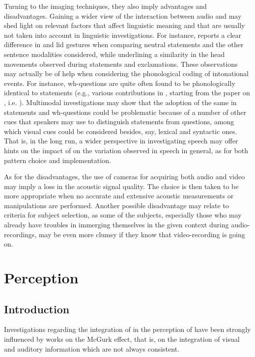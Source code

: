 \documentclass[output=paper]{langsci/langscibook}
\begin{document}
Turning to the imaging techniques, they also imply advantages and disadvantages. Gaining a wider view of the interaction between audio and  may shed light on relevant factors that affect linguistic meaning and that are usually not taken into account in linguistic investigations. For instance, \citet{GiliFivela2015informazionimultimodali} reports a clear difference in  and lid gestures when comparing neutral statements and the other sentence modalities considered, while underlining a similarity in the head movements observed during statements and exclamations. These observations may actually be of help when considering the phonological coding of intonational events. For instance, wh-questions are quite often found to be phonologically identical to statements (e.g., various contributions in \citealt{frotaPrieto2015}, starting from the paper on , i.e. \citealt{GiliFivelaETAL2015intonationalvariation}). Multimodal investigations may show that the adoption of the same  in statements and wh-questions could be problematic because of a number of other cues that speakers may use to distinguish statements from questions, among which visual cues could be considered besides, say, lexical and syntactic ones. That is, in the long run, a wider perspective in investigating speech may offer hints on the impact of  on the variation observed in speech in general, as for both pattern choice and  implementation.

As for the disadvantages,  the use of cameras for acquiring both audio and video may imply a loss in the acoustic signal quality. The choice is then taken to be more appropriate when no accurate and extensive acoustic measurements or manipulations are performed. Another possible disadvantage may relate to criteria for subject selection, as some of the subjects, especially those who may already have troubles in immerging themselves in the given context during audio-recordings, may be even more clumsy if they know that video-recording is going on.\largerpage

\section{Perception} \label{sec:gil:3}
\subsection{Introduction} \label{sec:gil:3:1}
Investigations regarding the integration of  in the perception of  have been strongly influenced by works on the McGurk effect, that is, on the integration of visual and auditory information which are not always consistent. 
\end{document}
